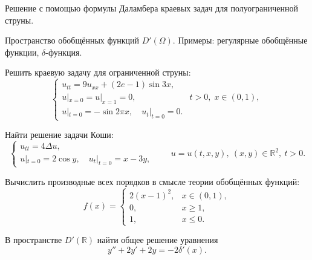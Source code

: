 
\begin{cond}
	Решение с помощью формулы Даламбера краевых задач для полуограниченной струны.
\end{cond}

\begin{cond}
	Пространство обобщённых функций $D'(\Omega)$. Примеры: регулярные обобщённые функции, $\delta$-функция.
\end{cond}

\begin{cond}
	Решить краевую задачу для ограниченной струны:
	\[
		\begin{cases}
			u_{tt} = 9u_{xx} + (2e - 1)\sin 3x,              \\
			u|_{x=0} = u|_{x=1} = 0, & t > 0,\; x \in (0,1), \\
			u|_{t=0} = -\sin 2\pi x,\quad u_t|_{t=0} = 0.
		\end{cases}
	\]
\end{cond}

\begin{cond}
	Найти решение задачи Коши:
	\[
		\begin{cases}
			u_{tt} = 4\Delta u, \\
			u|_{t=0} = 2\cos y,\quad u_t|_{t=0} = x - 3y,
		\end{cases}
		\qquad
		u = u(t,x,y),\ (x,y)\in\mathbb{R}^2,\ t>0.
	\]
\end{cond}

\begin{sol}

\end{sol}

\begin{out}

\end{out}

\begin{cond}
	Вычислить производные всех порядков в смысле теории обобщённых функций:
	\[
		f(x) =
		\begin{cases}
			2(x-1)^2, & x \in (0,1), \\
			0,        & x \ge 1,     \\
			1,        & x \le 0.
		\end{cases}
	\]
\end{cond}

\begin{cond}
	В пространстве \(D'(\mathbb{R})\) найти общее решение уравнения
	\[
		y'' + 2y' + 2y = -2\delta'(x).
	\]
\end{cond}
